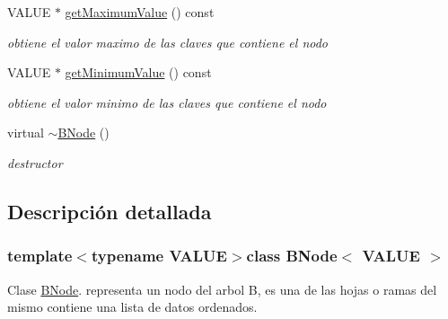 \begin{DoxyCompactItemize}
\item 
V\-A\-L\-U\-E $\ast$ \hyperlink{classBNode_a05a6d30b4dbe5e81fcbee26f365a2cca}{get\-Maximum\-Value} () const 
\begin{DoxyCompactList}\small\item\em obtiene el valor maximo de las claves que contiene el nodo \end{DoxyCompactList}\item 
V\-A\-L\-U\-E $\ast$ \hyperlink{classBNode_ab81e066860a4d57a419dc594e8fc3914}{get\-Minimum\-Value} () const 
\begin{DoxyCompactList}\small\item\em obtiene el valor minimo de las claves que contiene el nodo \end{DoxyCompactList}\item 
\hypertarget{classBNode_ac92421575ed510386d4e4ec1ab8ab1a4}{virtual \hyperlink{classBNode_ac92421575ed510386d4e4ec1ab8ab1a4}{$\sim$\-B\-Node} ()}\label{classBNode_ac92421575ed510386d4e4ec1ab8ab1a4}

\begin{DoxyCompactList}\small\item\em destructor \end{DoxyCompactList}\end{DoxyCompactItemize}


\subsection{Descripción detallada}
\subsubsection*{template$<$typename V\-A\-L\-U\-E$>$class B\-Node$<$ V\-A\-L\-U\-E $>$}

Clase \hyperlink{classBNode}{B\-Node}. representa un nodo del arbol B, es una de las hojas o ramas del mismo contiene una lista de datos ordenados. 

